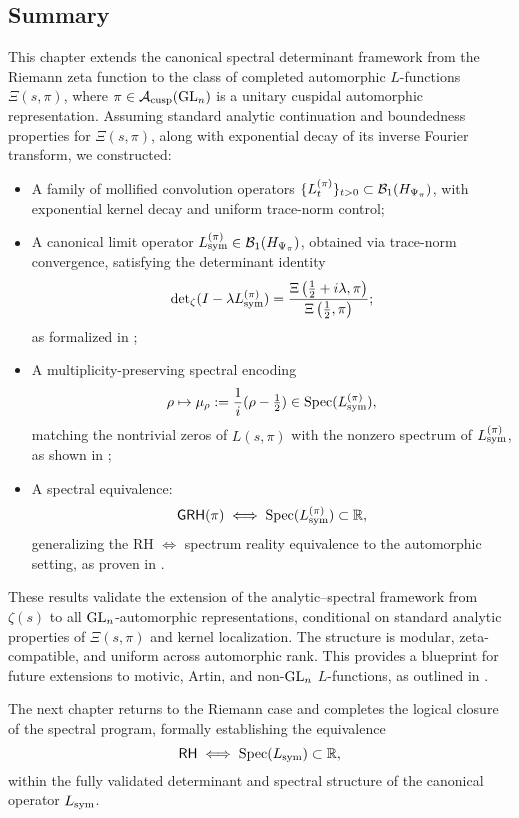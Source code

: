 \subsection*{Summary}

This chapter extends the canonical spectral determinant framework from the Riemann zeta function to the class of completed automorphic \( L \)-functions \( \Xi(s, \pi) \), where \( \pi \in \mathcal{A}_{\mathrm{cusp}}(\mathrm{GL}_n) \) is a unitary cuspidal automorphic representation. Assuming standard analytic continuation and boundedness properties for \( \Xi(s, \pi) \), along with exponential decay of its inverse Fourier transform, we constructed:

\begin{itemize}
  \item A family of mollified convolution operators \( \{ L_t^{(\pi)} \}_{t > 0} \subset \mathcal{B}_1(H_{\Psi_{\pi}}) \), with exponential kernel decay and uniform trace-norm control;

  \item A canonical limit operator \( L_{\mathrm{sym}}^{(\pi)} \in \mathcal{B}_1(H_{\Psi_{\pi}}) \), obtained via trace-norm convergence, satisfying the determinant identity
  \[
  \det\nolimits_{\zeta}(I - \lambda L_{\mathrm{sym}}^{(\pi)}) = \frac{\Xi\left(\tfrac{1}{2} + i\lambda, \pi\right)}{\Xi\left(\tfrac{1}{2}, \pi\right)};
  \]
  as formalized in ;

  \item A multiplicity-preserving spectral encoding
  \[
  \rho \mapsto \mu_\rho := \frac{1}{i}(\rho - \tfrac{1}{2}) \in \operatorname{Spec}(L_{\mathrm{sym}}^{(\pi)}),
  \]
  matching the nontrivial zeros of \( L(s, \pi) \) with the nonzero spectrum of \( L_{\mathrm{sym}}^{(\pi)} \), as shown in ;

  \item A spectral equivalence:
  \[
  \mathsf{GRH}(\pi) \iff \operatorname{Spec}(L_{\mathrm{sym}}^{(\pi)}) \subset \mathbb{R},
  \]
  generalizing the RH \( \iff \) spectrum reality equivalence to the automorphic setting, as proven in .
\end{itemize}

\medskip

These results validate the extension of the analytic–spectral framework from \( \zeta(s) \) to all \( \mathrm{GL}_n \)-automorphic representations, conditional on standard analytic properties of \( \Xi(s, \pi) \) and kernel localization. The structure is modular, zeta-compatible, and uniform across automorphic rank. This provides a blueprint for future extensions to motivic, Artin, and non-\( \mathrm{GL}_n \) \( L \)-functions, as outlined in .

\medskip

The next chapter returns to the Riemann case and completes the logical closure of the spectral program, formally establishing the equivalence
\[
\mathsf{RH} \iff \operatorname{Spec}(L_{\mathrm{sym}}) \subset \mathbb{R},
\]
within the fully validated determinant and spectral structure of the canonical operator \( L_{\mathrm{sym}} \).
